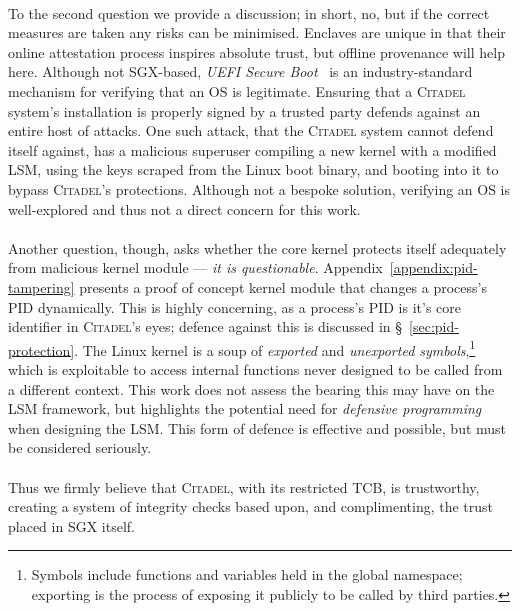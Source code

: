 \paragraph{} To the second question we provide a discussion; in short, no, but if the correct measures are taken any risks can be minimised. Enclaves are unique in that their online attestation process inspires absolute trust, but offline provenance will help here. Although not SGX-based, \textit{UEFI Secure Boot}~\cite{Richardson2013UefiSB} is an industry-standard mechanism for verifying that an OS is legitimate. Ensuring that a \textsc{Citadel} system's installation is properly signed by a trusted party defends against an entire host of attacks. One such attack, that the \textsc{Citadel} system cannot defend itself against, has a malicious superuser compiling a new kernel with a modified LSM, using the keys scraped from the Linux boot binary, and booting into it to bypass \textsc{Citadel}'s protections. Although not a bespoke solution, verifying an OS is well-explored and thus not a direct concern for this work.

\paragraph{} Another question, though, asks whether the core kernel protects itself adequately from malicious kernel module --- \textit{it is questionable}. Appendix~\ref{appendix:pid-tampering} presents a proof of concept kernel module that changes a process's PID dynamically. This is highly concerning, as a process's PID is it's core identifier in \textsc{Citadel}'s eyes; defence against this is discussed in §~\ref{sec:pid-protection}. The Linux kernel is a soup of \textit{exported} and \textit{unexported symbols},\footnote{Symbols include functions and variables held in the global namespace; exporting is the process of exposing it publicly to be called by third parties.} which is exploitable to access internal functions never designed to be called from a different context. This work does not assess the bearing this may have on the LSM framework, but highlights the potential need for \textit{defensive programming} when designing the LSM. This form of defence is effective and possible, but must be considered seriously.

\paragraph{} Thus we firmly believe that \textsc{Citadel}, with its restricted TCB, is trustworthy, creating a system of integrity checks based upon, and complimenting, the trust placed in SGX itself.

